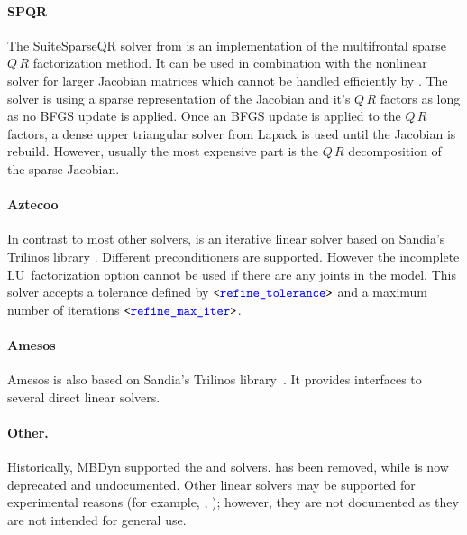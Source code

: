 \paragraph{SPQR}
The SuiteSparseQR solver  from \cite{SUITESPARSE-QR-2011} is an implementation
of the multifrontal sparse $Q\,R$ factorization method. It can be used in combination
with the  nonlinear solver for larger Jacobian matrices which cannot be
handled efficiently by . The  solver is using a sparse representation
of the Jacobian and it's $Q\,R$ factors as long as no BFGS update is applied.
Once an BFGS update is applied to the $Q\,R$ factors, a dense upper triangular solver
from Lapack is used until the Jacobian is rebuild. However, usually the most expensive
part is the $Q\,R$ decomposition of the sparse Jacobian.

\paragraph{Aztecoo}
In contrast to most other solvers,  is an iterative linear solver based on
Sandia's Trilinos library \cite{TRILINOS-WEBSITE}. Different preconditioners are supported.
However the incomplete LU~factorization option  cannot be used if there are any
joints in the model. This solver accepts a tolerance defined by $\texttt{<\textcolor{blue}{refine\_tolerance}>}$ and
a maximum number of iterations $\texttt{<\textcolor{blue}{refine\_max\_iter}>}$.

\paragraph{Amesos}
Amesos is also based on Sandia's Trilinos library~\cite{TRILINOS-WEBSITE}.
It provides interfaces to several direct linear solvers.

\begin{comment}
Another linear solver, that is available mostly for historical reasons, 
is \kw{harwell}, with a \nt{workspace\_size}
of $ \nt{numdofs}\times\nt{numdofs} $, but in certain cases the user
might prefer a smaller workspace, since the matrix is handled as sparse,
while sometimes a larger space is required, since when the matrix is
full, a little more space is required, due to extra storage needs when
the matrix fills up.
\end{comment}

\paragraph{Other.}
Historically, MBDyn supported the  and  solvers.
 has been removed, while 
is now deprecated and undocumented.
Other linear solvers may be supported for experimental reasons
(for example, , );
however, they are not documented as they are not intended for general use.

